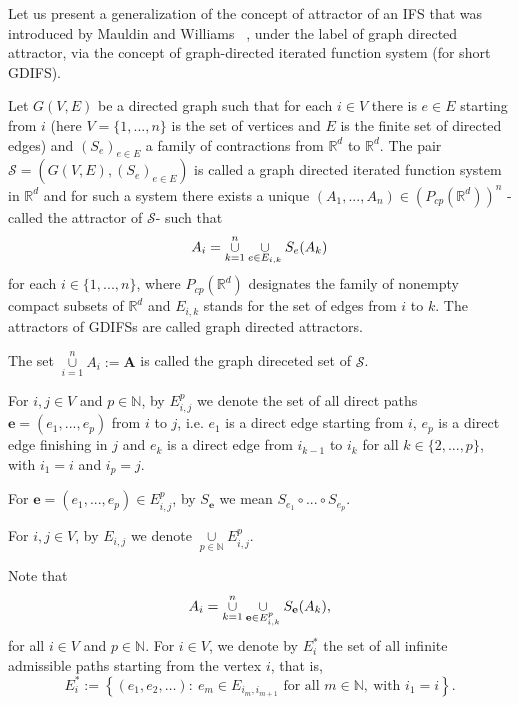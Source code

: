 \documentclass[a4paper,12pt,reqno]{amsart}
\numberwithin{equation}{section}
\theoremstyle{definition}
\theoremstyle{remark}
\numberwithin{equation}{section}
\begin{document}
Let us present a generalization of the concept of attractor of an IFS that was introduced by Mauldin and Williams \cite{MW}\ , under the label of graph directed attractor, via the concept of graph-directed iterated function system (for short GDIFS).

Let $G(V,E)$ be a directed graph such that for each $i\in V$ there is $e\in E
$ starting from $i$ (here $V=\{1,...,n\}$ is the set of vertices and $E$ is
the finite set of directed edges) and $(S_{e})_{e\in E}$ a family of
contractions from $\mathbb{R}^{d}$ to $\mathbb{R}^{d}$. The pair $\mathcal{S}=(G(V,E),(S_{e})_{e\in E})$ is called a graph directed
iterated function system in $\mathbb{R}^{d}$ and for such a system there
exists a unique $(A_{1},...,A_{n})\in (P_{cp}(\mathbb{R}^{d}))^{n}$ -called
the attractor of $\mathcal{S}$- such that \begin{equation}\label{ATR}A_{i}=\overset{n}{\underset{k=1}{%
\cup }}\underset{e\in E_{i,k}}{\cup }S_{e}(A_{k})\end{equation} for each $i\in \{1,...,n\}
$, where $P_{cp}(\mathbb{R}^{d})$ designates the family of nonempty compact
subsets of $\mathbb{R}^{d}$ and $E_{i,k}$ stands for the set of edges from $i
$ to $k$. The attractors of GDIFSs are called graph directed attractors.

The set $\overset{n}{\underset{i=1}{\cup }}A_{i}:=
\mathbf{A}$ is called the graph direceted set of $\mathcal{S}$.

For $i,j\in V$ and $p\in \mathbb{N}$, by $E_{i,j}^{p}$ we denote the set of
all direct paths $\mathbf{e}=(e_{1},...,e_{p})$ from $i$ to $j$, i.e. $e_{1}$
is a direct edge starting from $i$, $e_{p}$ is a direct edge finishing in $j$
and $e_{k}$ is a direct edge from $i_{k-1}$ to $i_{k}$ for all $k\in
\{2,...,p\}$, with $i_{1}=i$ and $i_{p}=j$.

For $\mathbf{e}=(e_{1},...,e_{p})\in E_{i,j}^{p}$, by $S_{\mathbf{e}}$ we
mean $S_{e_{1}}\circ ...\circ S_{e_{p}}$.

For $i,j\in V$, by $E_{i,j}$ we denote $\underset{p\in \mathbb{N}}{\cup }%
E_{i,j}^{p}$.

Note that%
\begin{equation*}
A_{i}=\underset{k=1}{\overset{n}{\cup }}\underset{\mathbf{e}\in E_{i,k}^{p}}{%
\cup }S_{\mathbf{e}}(A_{k})\text{,}
\end{equation*}%
for all $i\in V$ and $p\in \mathbb{N}$.
For $i\in V$, we denote by $E_i^{*}$ the set of all infinite admissible paths
starting from the vertex $i$, that is,
\[
E_i^{*}:=
\left\{(e_1,e_2,\ldots):\ e_m\in E_{i_m,i_{m+1}}
\text{ for all }m\in\mathbb{N},\ \text{with } i_1=i\right\}.
\]
\end{document}
